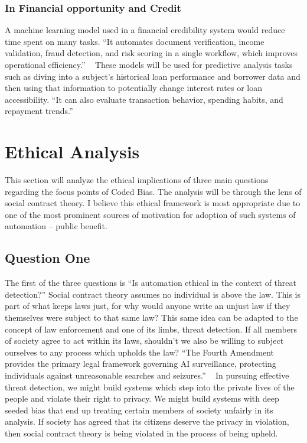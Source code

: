 \documentclass[sigconf, 10pt]{acmart}
\begin{document}
\subsubsection{In Financial opportunity and Credit}
A machine learning model used in a financial credibility system would reduce time spent on many tasks. “It automates document verification, income validation, fraud detection, and risk scoring in a single workflow, which improves operational efficiency.” ~\cite{used_seventh(6)} These models will be used for predictive analysis tasks such as diving into a subject’s historical loan performance and borrower data and then using that information to potentially change interest rates or loan accessibility. “It can also evaluate transaction behavior, spending habits, and repayment trends.” ~\cite{used_seventh(6)}
\section{Ethical Analysis}
This section will analyze the ethical implications of three main questions regarding the focus points of Coded Bias. The analysis will be through the lens of social contract theory. I believe this ethical framework is most appropriate due to one of the most prominent sources of motivation for adoption of such systems of automation -- public benefit.
\subsection{Question One}
The first of the three questions is “Is automation ethical in the context of threat detection?” Social contract theory assumes no individual is above the law. This is part of what keeps laws just, for why would anyone write an unjust law if they themselves were subject to that same law? This same idea can be adapted to the concept of law enforcement and one of its limbs, threat detection. If all members of society agree to act within its laws, shouldn’t we also be willing to subject ourselves to any process which upholds the law? “The Fourth Amendment provides the primary legal framework governing AI surveillance, protecting individuals against unreasonable searches and seizures.” ~\cite{used_tenth(9)} In pursuing effective threat detection, we might build systems which step into the private lives of the people and violate their right to privacy. We might build systems with deep seeded bias that end up treating certain members of society unfairly in its analysis. If society has agreed that its citizens deserve the privacy in violation, then social contract theory is being violated in the process of being upheld.
\end{document}
